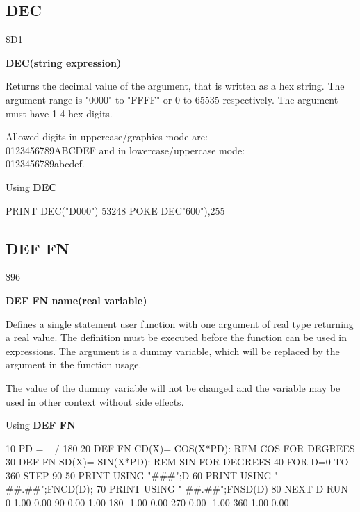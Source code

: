 
\newpage
\subsection{DEC}
\begin{description}[leftmargin=3cm,style=nextline]
\item [Token:] \$D1
\item [Format:] {\bf DEC(string expression)}
\item [Usage:] Returns the decimal value
               of the argument, that is written as a hex string.
               The argument range is "0000" to "FFFF" or
               0 to 65535 respectively.
               The argument must have 1-4 hex digits.

\item [Remarks:] Allowed digits in uppercase/graphics mode are: \\
                 0123456789ABCDEF and in lowercase/uppercase mode: \\
                 0123456789abcdef.

\item [Example:] Using {\bf DEC}
\begin{screenoutput}
  PRINT DEC("D000")
   53248
  POKE DEC"600"),255
\end{screenoutput}
\end{description}


\newpage
\subsection{DEF FN}
\begin{description}[leftmargin=3cm,style=nextline]
\item [Token:] \$96
\item [Format:] {\bf DEF FN name(real variable)}
\item [Usage:] Defines a single statement
               user function with one argument of real type
               returning a real value.
               The definition must be executed before the function
               can be used in expressions. The argument is
               a dummy variable, which will be replaced by the
               argument in the function usage.

\item [Remarks:] The value of the dummy variable will not be changed
                 and the variable may be used in other context
                 without side effects.

\item [Example:] Using {\bf DEF FN}
\begin{screenoutput}
10 PD = ~ / 180
20 DEF FN CD(X)= COS(X*PD): REM COS FOR DEGREES
30 DEF FN SD(X)= SIN(X*PD): REM SIN FOR DEGREES
40 FOR D=0 TO 360 STEP 90
50 PRINT USING "###";D
60 PRINT USING " ##.##";FNCD(D);
70 PRINT USING " ##.##";FNSD(D)
80 NEXT D
RUN
  0  1.00  0.00
 90  0.00  1.00
180 -1.00  0.00
270  0.00 -1.00
360  1.00  0.00
\end{screenoutput}
\end{description}


